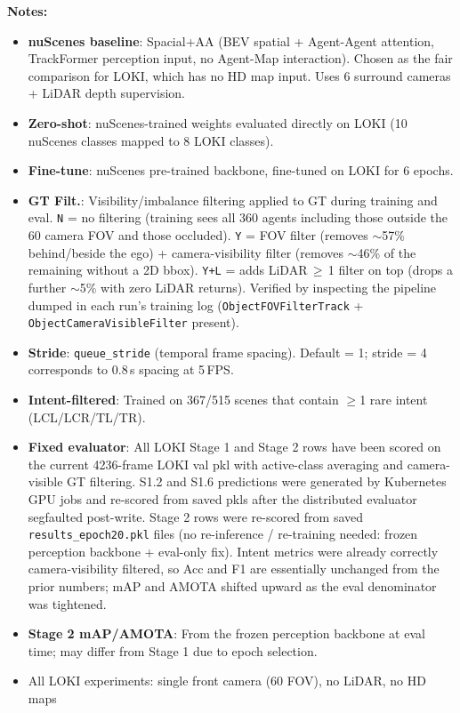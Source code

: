 \documentclass[11pt]{article}
\begin{document}
\vspace{0.5em}
\noindent\textbf{Notes:}
\begin{itemize}\setlength{\itemsep}{2pt}
  \item \textbf{nuScenes baseline}: Spacial+AA (BEV spatial + Agent-Agent attention, TrackFormer perception input, no Agent-Map interaction). Chosen as the fair comparison for LOKI, which has no HD map input. Uses 6 surround cameras + LiDAR depth supervision.
  \item \textbf{Zero-shot}: nuScenes-trained weights evaluated directly on LOKI (10 nuScenes classes mapped to 8 LOKI classes).
  \item \textbf{Fine-tune}: nuScenes pre-trained backbone, fine-tuned on LOKI for 6 epochs.
  \item \textbf{GT Filt.}: Visibility/imbalance filtering applied to GT during training and eval. \texttt{N} = no filtering (training sees all 360\textdegree{} agents including those outside the 60\textdegree{} camera FOV and those occluded). \texttt{Y} = FOV filter (removes $\sim$57\% behind/beside the ego) + camera-visibility filter (removes $\sim$46\% of the remaining without a 2D bbox). \texttt{Y+L} = adds LiDAR\,$\geq$\,1 filter on top (drops a further $\sim$5\% with zero LiDAR returns). Verified by inspecting the pipeline dumped in each run's training log (\texttt{ObjectFOVFilterTrack} + \texttt{ObjectCameraVisibleFilter} present).
  \item \textbf{Stride}: \texttt{queue\_stride} (temporal frame spacing). Default = 1; stride = 4 corresponds to 0.8\,s spacing at 5\,FPS.
  \item \textbf{Intent-filtered}: Trained on 367/515 scenes that contain $\geq$1 rare intent (LCL/LCR/TL/TR).
  \item \textbf{Fixed evaluator}: All LOKI Stage 1 and Stage 2 rows have been scored on the current 4236-frame LOKI val pkl with active-class averaging and camera-visible GT filtering. S1.2 and S1.6 predictions were generated by Kubernetes GPU jobs and re-scored from saved pkls after the distributed evaluator segfaulted post-write. Stage 2 rows were re-scored from saved \texttt{results\_epoch20.pkl} files (no re-inference / re-training needed: frozen perception backbone + eval-only fix). Intent metrics were already correctly camera-visibility filtered, so Acc and F1 are essentially unchanged from the prior numbers; mAP and AMOTA shifted upward as the eval denominator was tightened.
  \item \textbf{Stage 2 mAP/AMOTA}: From the frozen perception backbone at eval time; may differ from Stage 1 due to epoch selection.
  \item All LOKI experiments: single front camera (60\textdegree{} FOV), no LiDAR, no HD maps
\end{itemize}
\end{document}
